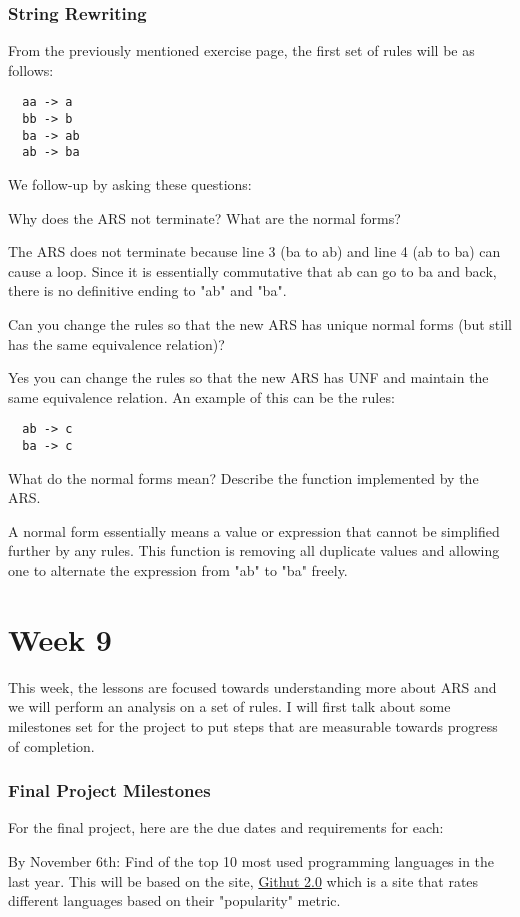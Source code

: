 \documentclass{article}
\theoremstyle{theorem}
\theoremstyle{definition}
\theoremstyle{remark}
\begin{document}
\subsubsection{String Rewriting}
From the previously mentioned exercise page, the first set of rules will be as follows:
\begin{lstlisting}
  aa -> a
  bb -> b
  ba -> ab
  ab -> ba
\end{lstlisting}
We follow-up by asking these questions:

\medskip
Why does the ARS not terminate?
What are the normal forms?

\medskip
The ARS does not terminate because line 3 (ba to ab) and line 4 (ab to ba) can cause a loop. Since it is essentially commutative that ab can go to ba and back, there is no definitive ending to "ab" and "ba".

\medskip
Can you change the rules so that the new ARS has unique normal forms (but still has the same equivalence relation)?

\medskip
Yes you can change the rules so that the new ARS has UNF and maintain the same equivalence relation. An example of this can be the rules:
\begin{lstlisting}
  ab -> c
  ba -> c
\end{lstlisting}

\medskip
What do the normal forms mean? Describe the function implemented by the ARS.

\medskip
A normal form essentially means a value or expression that cannot be simplified further by any rules. This function is removing all duplicate values and allowing one to alternate the expression from "ab" to "ba" freely. 

\section{Week 9} This week, the lessons are focused towards understanding more about ARS and we will perform an analysis on a set of rules. I will first talk about some milestones set for the project to put steps that are measurable towards progress of completion.

\subsubsection{Final Project Milestones}
For the final project, here are the due dates and requirements for each:

\medskip
By November 6th: Find of the top 10 most used programming languages in the last year. This will be based on the site, \href{https://madnight.github.io/githut/#/pull_requests/2021/4}{Githut 2.0} which is a site that rates different languages based on their "popularity" metric.
\end{document}
